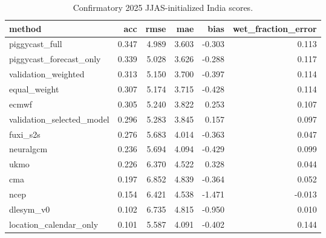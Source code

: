 \begin{table}
\caption{Confirmatory 2025 JJAS-initialized India scores.}
\label{tab:overall}
\begin{tabular}{lrrrrr}
\toprule
method & acc & rmse & mae & bias & wet\_fraction\_error \\
\midrule
piggycast\_full & 0.347 & 4.989 & 3.603 & -0.303 & 0.113 \\
piggycast\_forecast\_only & 0.339 & 5.028 & 3.626 & -0.288 & 0.117 \\
validation\_weighted & 0.313 & 5.150 & 3.700 & -0.397 & 0.114 \\
equal\_weight & 0.307 & 5.174 & 3.715 & -0.428 & 0.114 \\
ecmwf & 0.305 & 5.240 & 3.822 & 0.253 & 0.107 \\
validation\_selected\_model & 0.296 & 5.283 & 3.845 & 0.157 & 0.097 \\
fuxi\_s2s & 0.276 & 5.683 & 4.014 & -0.363 & 0.047 \\
neuralgcm & 0.236 & 5.694 & 4.094 & -0.429 & 0.099 \\
ukmo & 0.226 & 6.370 & 4.522 & 0.328 & 0.044 \\
cma & 0.197 & 6.852 & 4.839 & -0.364 & 0.052 \\
ncep & 0.154 & 6.421 & 4.538 & -1.471 & -0.013 \\
dlesym\_v0 & 0.102 & 6.735 & 4.815 & -0.950 & 0.010 \\
location\_calendar\_only & 0.101 & 5.587 & 4.091 & -0.402 & 0.144 \\
\bottomrule
\end{tabular}
\end{table}
